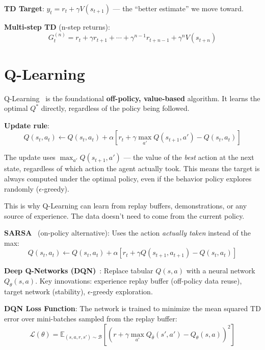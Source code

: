 \textbf{TD Target}: $y_t = r_t + \gamma V(s_{t+1})$ --- the ``better estimate'' we move toward.

\textbf{Multi-step TD} (n-step returns): 
\begin{equation}
G_t^{(n)} = r_t + \gamma r_{t+1} + \cdots + \gamma^{n-1} r_{t+n-1} + \gamma^n V(s_{t+n})
\end{equation}

\section{Q-Learning}
\label{q-learning}

Q-Learning~\cite{watkins1989learning} is the foundational \textbf{off-policy, value-based} algorithm. It learns the optimal $Q^*$ directly, regardless of the policy being followed.

\textbf{Update rule}: 
\begin{equation}
\boxed{Q(s_t, a_t) \leftarrow Q(s_t, a_t) + \alpha\left[r_t + \gamma \max_{a'} Q(s_{t+1}, a') - Q(s_t, a_t)\right]}
\end{equation}

\begin{intuitionbox}
The update uses $\max_{a'} Q(s_{t+1}, a')$ --- the value of the \emph{best} action at the next state, regardless of which action the agent actually took. This means the target is always computed under the optimal policy, even if the behavior policy explores randomly ($\epsilon$-greedy).

This is why Q-Learning can learn from replay buffers, demonstrations, or any source of experience. The data doesn’t need to come from the current policy.
\end{intuitionbox}

\textbf{SARSA}~\cite{rummery1994online} (on-policy alternative): Uses the action \emph{actually taken} instead of the max: 
\begin{equation}
Q(s_t, a_t) \leftarrow Q(s_t, a_t) + \alpha\left[r_t + \gamma Q(s_{t+1}, a_{t+1}) - Q(s_t, a_t)\right]
\end{equation}

\textbf{Deep Q-Networks (DQN)}~\cite{mnih2015human}: Replace tabular $Q(s,a)$ with a neural network $Q_\theta(s,a)$. Key innovations: experience replay buffer (off-policy data reuse), target network (stability), $\epsilon$-greedy exploration.

\textbf{DQN Loss Function}: The network is trained to minimize the mean squared TD error over mini-batches sampled from the replay buffer: 
\begin{equation}
\boxed{\mathcal{L}(\theta) = \mathbb{E}_{(s,a,r,s') \sim \mathcal{B}}\!\left[\left(r + \gamma \max_{a'} Q_{\bar{\theta}}(s', a') - Q_\theta(s, a)\right)^2\right]}
\end{equation}

